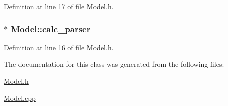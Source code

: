 Definition at line 17 of file Model.\+h.

\hypertarget{classModel_a3a8c01642927aabcbdd833a2119c05a6}{}
\subsubsection[{calc\+\_\+parser}]{$\ast$ Model\+::calc\+\_\+parser\hspace{0.3cm}{\ttfamily [protected]}}\label{classModel_a3a8c01642927aabcbdd833a2119c05a6}


Definition at line 16 of file Model.\+h.



The documentation for this class was generated from the following files\+:\begin{DoxyCompactItemize}
\item 
\hyperlink{Model_8h}{Model.\+h}\item 
\hyperlink{Model_8cpp}{Model.\+cpp}\end{DoxyCompactItemize}
